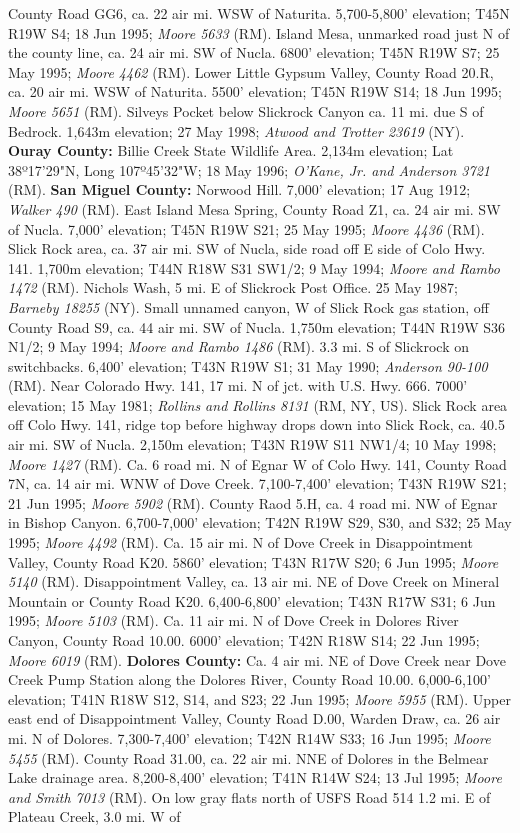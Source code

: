 County Road GG6, ca. 22 air mi. WSW of Naturita. 5,700-5,800' elevation; T45N R19W S4; 18 Jun 1995; \textit{Moore 5633} (RM).  Island Mesa, unmarked road just N of the county line, ca. 24 air mi. SW of Nucla. 6800' elevation; T45N R19W S7; 25 May 1995; \textit{Moore 4462} (RM).  Lower Little Gypsum Valley, County Road 20.R, ca. 20 air mi. WSW of Naturita. 5500' elevation; T45N R19W S14; 18 Jun 1995; \textit{Moore 5651} (RM).  Silveys Pocket below Slickrock Canyon ca. 11 mi. due S of Bedrock. 1,643m elevation; 27 May 1998; \textit{Atwood and Trotter 23619} (NY).  \textbf{Ouray County:} Billie Creek State Wildlife Area. 2,134m elevation; Lat 38º17'29"N, Long 107º45'32"W; 18 May 1996; \textit{O'Kane, Jr. and Anderson 3721} (RM).  \textbf{San Miguel County:} Norwood Hill. 7,000' elevation; 17 Aug 1912; \textit{Walker 490} (RM).  East Island Mesa Spring, County Road Z1, ca. 24 air mi. SW of Nucla. 7,000' elevation; T45N R19W S21; 25 May 1995; \textit{Moore 4436} (RM).  Slick Rock area, ca. 37 air mi. SW of Nucla, side road off E side of Colo Hwy. 141. 1,700m elevation; T44N R18W S31 SW1/2; 9 May 1994; \textit{Moore and Rambo 1472} (RM).  Nichols Wash, 5 mi. E of Slickrock Post Office. 25 May 1987; \textit{Barneby 18255} (NY).  Small unnamed canyon, W of Slick Rock gas station, off County Road S9, ca. 44 air mi. SW of Nucla. 1,750m elevation; T44N R19W S36 N1/2; 9 May 1994; \textit{Moore and Rambo 1486} (RM). 3.3 mi. S of Slickrock on switchbacks. 6,400' elevation; T43N R19W S1; 31 May 1990; \textit{Anderson 90-100} (RM).  Near Colorado Hwy. 141, 17 mi. N of jct. with U.S. Hwy. 666. 7000' elevation; 15 May 1981; \textit{Rollins and Rollins 8131} (RM, NY, US).  Slick Rock area off Colo Hwy. 141, ridge top before highway drops down into Slick Rock, ca. 40.5 air mi. SW of Nucla. 2,150m elevation; T43N R19W S11 NW1/4; 10 May 1998; \textit{Moore 1427} (RM).  Ca. 6 road mi. N of Egnar W of Colo Hwy. 141, County Road 7N, ca. 14 air mi. WNW of Dove Creek. 7,100-7,400' elevation; T43N R19W S21; 21 Jun 1995; \textit{Moore 5902} (RM).  County Raod 5.H, ca. 4 road mi. NW of Egnar in Bishop Canyon. 6,700-7,000' elevation; T42N R19W S29, S30, and S32; 25 May 1995; \textit{Moore 4492} (RM).  Ca. 15 air mi. N of Dove Creek in Disappointment Valley, County Road K20. 5860' elevation; T43N R17W S20; 6 Jun 1995; \textit{Moore 5140} (RM).  Disappointment Valley, ca. 13 air mi. NE of Dove Creek on Mineral Mountain or County Road K20. 6,400-6,800' elevation; T43N R17W S31; 6 Jun 1995; \textit{Moore 5103} (RM).  Ca. 11 air mi. N of Dove Creek in Dolores River Canyon, County Road 10.00. 6000' elevation; T42N R18W S14; 22 Jun 1995; \textit{Moore 6019} (RM).  \textbf{Dolores County:} Ca. 4 air mi. NE of Dove Creek near Dove Creek Pump Station along the Dolores River, County Road 10.00. 6,000-6,100' elevation; T41N R18W S12, S14, and S23; 22 Jun 1995; \textit{Moore 5955} (RM).  Upper east end of Disappointment Valley, County Road D.00, Warden Draw, ca. 26 air mi. N of Dolores. 7,300-7,400' elevation; T42N R14W S33; 16 Jun 1995; \textit{Moore 5455} (RM).  County Road 31.00, ca. 22 air mi. NNE of Dolores in the Belmear Lake drainage area. 8,200-8,400' elevation; T41N R14W S24; 13 Jul 1995; \textit{Moore and Smith 7013} (RM).  On low gray flats north of USFS Road 514 1.2 mi. E of Plateau Creek, 3.0 mi. W of 